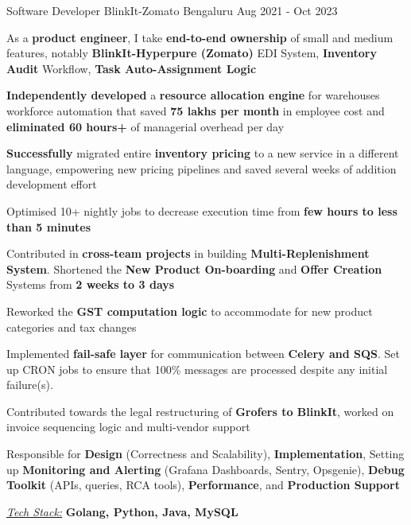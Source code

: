 \documentclass[11pt, a4paper]{awesome-cv} %
\begin{document}
\begin{cventries}
  \cventry
    {Software Developer} %
    {BlinkIt-Zomato} %
    {Bengaluru} %
    {Aug 2021 - Oct 2023} %
    {
      \begin{cvitems} %
        \item {As a \textbf{product engineer}, I take \textbf{end-to-end ownership} of small and medium features, notably \textbf{BlinkIt-Hyperpure (Zomato)} EDI System, \textbf{Inventory Audit} Workflow, \textbf{Task Auto-Assignment Logic}}
        \item {\textbf{Independently developed} a \textbf{resource allocation engine} for warehouses workforce automation that saved \textbf{75 lakhs per month} in employee cost and \textbf{eliminated 60 hours+} of managerial overhead per day}
        \item {\textbf{Successfully} migrated entire \textbf{inventory pricing} to a new service in a different language, empowering new pricing pipelines and saved several weeks of addition development effort}
        \item{Optimised 10+ nightly jobs to decrease execution time from \textbf{few hours to less than 5 minutes}}
        \item {Contributed in \textbf{cross-team projects} in building \textbf{Multi-Replenishment System}. Shortened the \textbf{New Product On-boarding} and \textbf{Offer Creation} Systems from \textbf{2 weeks to 3 days}}
        \item{Reworked the \textbf{GST computation logic} to accommodate for new product categories and tax changes}
        \item {Implemented \textbf{fail-safe layer} for communication between \textbf{Celery and SQS}. Set up CRON jobs to ensure that 100\% messages are processed despite any initial failure(s).}
        \item {Contributed towards the legal restructuring of \textbf{Grofers to BlinkIt}, worked on invoice sequencing logic and multi-vendor support}
        \item {Responsible for \textbf{Design} (Correctness and Scalability), \textbf{Implementation}, Setting up \textbf{Monitoring and Alerting} (Grafana Dashboards, Sentry, Opsgenie), \textbf{Debug Toolkit} (APIs, queries, RCA tools), \textbf{Performance}, and \textbf{Production Support}}
        \item {\textit{\href{}{\color{awesome-red} Tech Stack:}} \textbf{Golang, Python, Java, MySQL}}
      \end{cvitems}
    }



\end{cventries}
\end{document}
